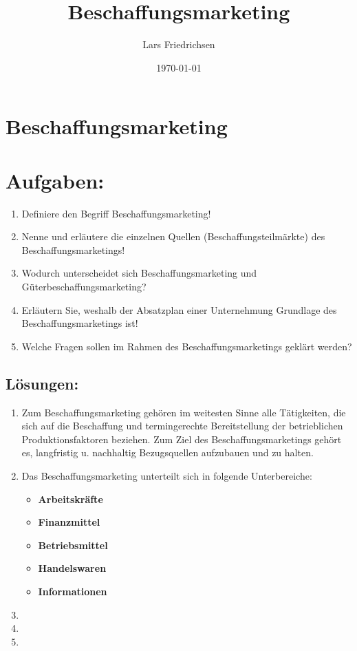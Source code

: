 \documentclass[a4paper,11pt]{scrartcl}	%
\title{Beschaffungsmarketing}
\author{Lars Friedrichsen}
\date{\today}
\begin{document}
\section{Beschaffungsmarketing}


\section{Aufgaben:}

	\begin{enumerate}
		\item Definiere den Begriff Beschaffungsmarketing!
		\item Nenne und erläutere die einzelnen Quellen (Beschaffungsteilmärkte) des Beschaffungsmarketings!
		\item Wodurch unterscheidet sich Beschaffungsmarketing und Güterbeschaffungsmarketing?
		\item Erläutern Sie, weshalb der Absatzplan einer Unternehmung Grundlage des Beschaffungsmarketings ist!
		\item Welche Fragen sollen im Rahmen des Beschaffungsmarketings geklärt werden?
	\end{enumerate}
	
	\subsection{Lösungen:}
	
		\begin{enumerate}
			\item Zum Beschaffungsmarketing gehören im weitesten Sinne alle Tätigkeiten, die sich auf die Beschaffung
			und termingerechte Bereitstellung der betrieblichen Produktionsfaktoren beziehen.
			Zum Ziel des Beschaffungsmarketings gehört es, langfristig u. nachhaltig Bezugsquellen aufzubauen und zu halten.
			\item Das Beschaffungsmarketing unterteilt sich in folgende Unterbereiche:
				\begin{itemize}
					\item \textbf{Arbeitskräfte}
					\item \textbf{Finanzmittel} 
					\item \textbf{Betriebsmittel} 
					\item \textbf{Handelswaren}
					\item \textbf{Informationen}
				\end{itemize}				 
			\item 
			\item 
			\item
		\end{enumerate}
	
	
\end{document}
